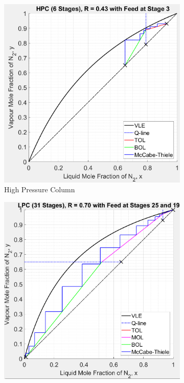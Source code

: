     \begin{figure}[ht]
        \begin{subfigure}{0.49\textwidth}
            \includegraphics[width=\linewidth]{airseparation/handouts/graphics/HPC_v1a.jpeg}
            \caption{High Pressure Column}
            \label{fig:HPC_v1}
        \end{subfigure}
        \hspace*{\fill} %
        \begin{subfigure}{0.49\textwidth}
            \includegraphics[width=\linewidth]{airseparation/handouts/graphics/LPC_v1a.jpeg}

\end{subfigure}
\end{figure}
